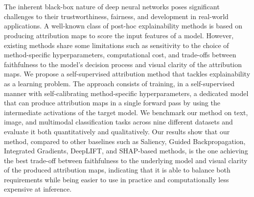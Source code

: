 \hspace{0pt}
\vfill

\thispagestyle{empty}
\section*{}
\noindent

The inherent black-box nature of deep neural networks poses significant challenges to their trustworthiness, fairness, and development in real-world applications. A well-known class of post-hoc explainability methods is based on producing attribution maps to score the input features of a model. However, existing methods share some limitations such as sensitivity to the choice of method-specific hyperparameters, computational cost, and trade-offs between faithfulness to the model's decision process and visual clarity of the attribution maps.
We propose a self-supervised attribution method that tackles explainability as a learning problem. The approach consists of training, in a self-supervised manner with self-calibrating method-specific hyperparameters, a dedicated model that can produce attribution maps in a single forward pass by using the intermediate activations of the target model.
We benchmark our method on text, image, and multimodal classification tasks across nine different datasets and evaluate it both quantitatively and qualitatively. Our results show that our method, compared to other baselines such as Saliency, Guided Backpropagation, Integrated Gradients, DeepLIFT, and SHAP-based methods, is the one achieving the best trade-off between faithfulness to the underlying model and visual clarity of the produced attribution maps, indicating that it is able to balance both requirements while being easier to use in practice and computationally less expensive at inference.


\vfill
\hspace{0pt}